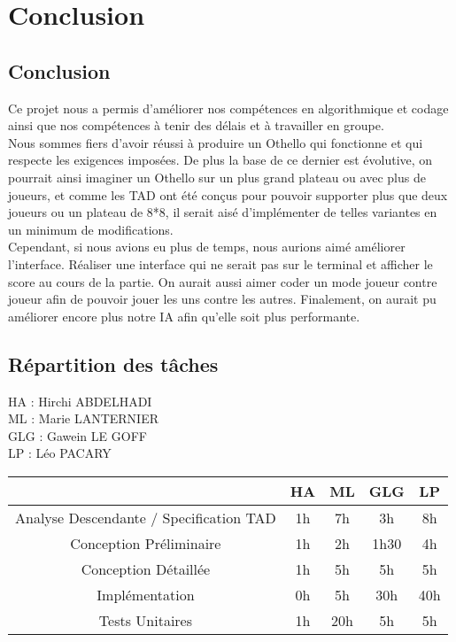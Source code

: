 \pagebreak
\section{Conclusion}

\subsection{Conclusion}
Ce projet nous a permis d'améliorer nos compétences en algorithmique et codage ainsi que nos compétences à tenir des délais et à travailler en groupe.\\

Nous sommes fiers d'avoir réussi à produire un Othello qui fonctionne et qui respecte les exigences imposées. De plus la base de ce dernier est évolutive, on pourrait ainsi imaginer un Othello sur un plus grand plateau ou avec plus de joueurs, et comme les TAD ont été conçus pour pouvoir supporter plus que deux joueurs ou un plateau de 8*8, il serait aisé d'implémenter de telles variantes en un minimum de modifications. \\

Cependant, si nous avions eu plus de temps, nous aurions aimé améliorer l'interface. Réaliser une interface qui ne serait pas sur le terminal et afficher le score au cours de la partie. On aurait aussi aimer coder un mode joueur contre joueur afin de pouvoir jouer les uns contre les autres. Finalement, on aurait pu améliorer encore plus notre IA afin qu'elle soit plus performante.

\subsection{Répartition des tâches}

\noindent HA : Hirchi ABDELHADI\\
ML : Marie LANTERNIER\\
GLG : Gawein LE GOFF\\
LP : Léo PACARY\\

\begin{tabular}{|c|c|c|c|c|}
\hline 
  & HA & ML & GLG & LP \\ 
\hline 
Analyse Descendante / Specification TAD & 1h & 7h & 3h & 8h \\ 
\hline 
Conception Préliminaire & 1h & 2h & 1h30 & 4h \\ 
\hline 
Conception Détaillée & 1h & 5h & 5h & 5h \\ 
\hline 
Implémentation & 0h & 5h & 30h & 40h \\ 
\hline 
Tests Unitaires & 1h & 20h & 5h & 5h \\ 
\hline 
\end{tabular} 


